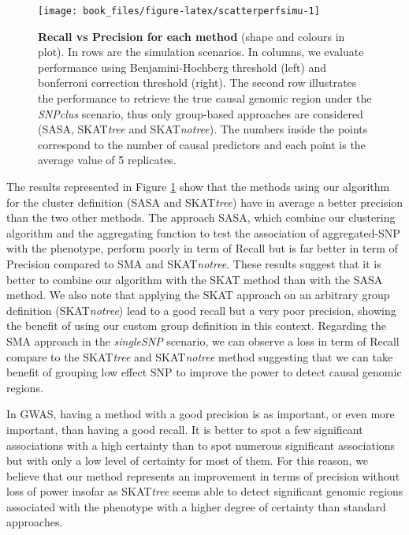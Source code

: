 \documentclass[]{book}
\begin{document}
\begin{figure}

{\centering \texttt{[image: book\_files/figure-latex/scatterperfsimu-1]} 

}

\caption{\textbf{Recall vs Precision for each method} (shape and colours in plot). In rows are the simulation scenarios. In columns, we evaluate performance using Benjamini-Hochberg threshold (left) and bonferroni correction threshold (right). The second row illustrates the performance to retrieve the true causal genomic region under the \emph{SNPclus} scenario, thus only group-based approaches are considered (SASA, SKAT\emph{tree} and SKAT\emph{notree}). The numbers inside the points correspond to the number of causal predictors and each point is the average value of 5 replicates.}\label{fig:scatterperfsimu}
\end{figure}

The results represented in Figure \ref{fig:scatterperfsimu} show that
the methods using our algorithm for the cluster definition (SASA and
SKAT\emph{tree}) have in average a better precision than the two other
methods. The approach SASA, which combine our clustering algorithm and
the aggregating function to test the association of aggregated-SNP with
the phenotype, perform poorly in term of Recall but is far better in
term of Precision compared to SMA and SKAT\emph{notree}. These results
suggest that it is better to combine our algorithm with the SKAT method
than with the SASA method. We also note that applying the SKAT approach
on an arbitrary group definition (SKAT\emph{notree}) lead to a good recall
but a very poor precision, showing the benefit of using our custom group
definition in this context. Regarding the SMA approach in the
\emph{singleSNP} scenario, we can observe a loss in term of Recall compare to
the SKAT\emph{tree} and SKAT\emph{notree} method suggesting that we can take
benefit of grouping low effect SNP to improve the power to detect causal
genomic regions.

In GWAS, having a method with a good precision is as important, or even
more important, than having a good recall. It is better to spot a few
significant associations with a high certainty than to spot numerous
significant associations but with only a low level of certainty for most
of them. For this reason, we believe that our method represents an
improvement in terms of precision without loss of power insofar as
SKAT\emph{tree} seems able to detect significant genomic regions associated
with the phenotype with a higher degree of certainty than standard
approaches.
\end{document}

